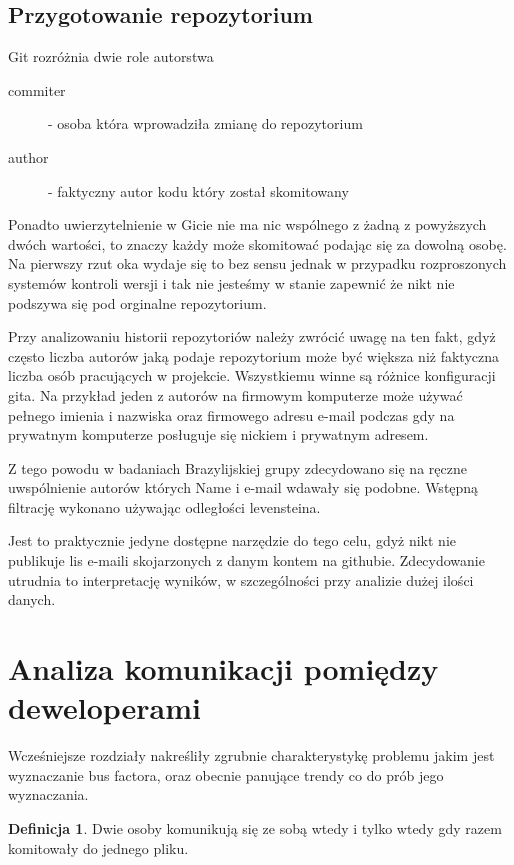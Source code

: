 \documentclass[a4paper,11pt,twoside]{report}
\theoremstyle{definition}
\newtheorem{definition}[theorem]{Definicja}
\begin{document}
\subsection{Przygotowanie repozytorium}

Git rozróżnia dwie role autorstwa
\begin{description}
\item[commiter] - osoba która wprowadziła zmianę do repozytorium
\item[author] - faktyczny autor kodu który został skomitowany
\end{description}

Ponadto uwierzytelnienie w Gicie nie ma nic wspólnego z żadną z powyższych 
dwóch wartości, to znaczy każdy może skomitować podając się za dowolną 
osobę. Na pierwszy rzut oka wydaje się to bez sensu jednak w przypadku 
rozproszonych systemów kontroli wersji i tak nie jesteśmy w stanie zapewnić 
że nikt nie podszywa się pod orginalne repozytorium.

Przy analizowaniu historii repozytoriów należy zwrócić uwagę na ten fakt, 
gdyż często liczba autorów jaką podaje repozytorium może być większa 
niż faktyczna liczba osób pracujących w projekcie. Wszystkiemu winne są 
różnice konfiguracji gita. Na przykład jeden z autorów na firmowym 
komputerze może używać pełnego imienia i nazwiska oraz firmowego adresu 
e-mail podczas gdy na prywatnym komputerze posługuje się nickiem i prywatnym 
adresem.

Z tego powodu w badaniach Brazylijskiej grupy zdecydowano się na ręczne 
uwspólnienie autorów których Name i e-mail wdawały się podobne. Wstępną 
filtrację wykonano używając odległości levensteina.

Jest to praktycznie jedyne dostępne narzędzie do tego celu, gdyż nikt nie 
publikuje lis e-maili skojarzonych z danym kontem na githubie. Zdecydowanie 
utrudnia to interpretację wyników, w szczególności przy analizie dużej 
ilości danych.

\section{Analiza komunikacji pomiędzy deweloperami}

Wcześniejsze rozdziały nakreśliły zgrubnie charakterystykę problemu jakim 
jest wyznaczanie bus factora, oraz obecnie panujące trendy co do prób jego 
wyznaczania.

\begin{definition}
Dwie osoby komunikują się ze sobą wtedy i tylko wtedy gdy razem komitowały 
do jednego pliku.
\end{definition}
\end{document}
